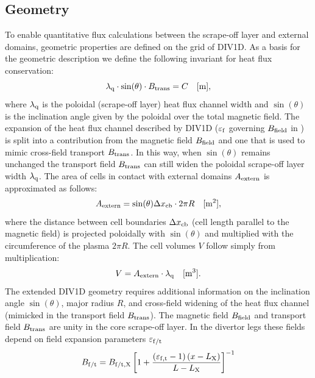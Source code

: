 \documentclass[amsmath,amssymb,a4]{revtex4-2}
\begin{document}
\subsection{Geometry}
To enable quantitative flux calculations between the scrape-off layer and external domains, geometric properties are defined on the grid of DIV1D. As a basis for the geometric description we define the following invariant for heat flux conservation:
\begin{equation}
    \lambda_{\rm q} \cdot \sin(\theta) \cdot B_{\rm trans} =  C \quad \mathrm{[m]}, 
\end{equation}
where $\lambda_{\rm q}$ is the poloidal (scrape-off layer) heat flux channel width and $\sin(\theta)$ is the inclination angle given by the poloidal over the total magnetic field. The expansion of the heat flux channel described by DIV1D  ($\varepsilon_{\rm f}$ governing $B_{\rm field}$ in \cite{derks2022}) is split into a contribution from the magnetic field $B_{\rm field}$ and one that is used to mimic cross-field transport $B_{\rm trans}$. In this way, when $\sin(\theta)$ remains unchanged the transport field $B_{\rm trans}$ can still widen the poloidal scrape-off layer width $\lambda_{\rm q}$.  
The area of cells in contact with external domains $A_{\rm extern}$ is approximated as follows:
\begin{equation}
    A_{\rm extern} =  \sin(\theta) \Delta x_{\rm cb}  \cdot 2 \pi R \quad \mathrm{[m^2]},
\end{equation}
where the distance between cell boundaries $\Delta x_{\rm cb}$  (cell length parallel to the magnetic field) is projected poloidally with $\sin(\theta)$ and multiplied with the circumference of the plasma $2\pi R$.
The cell volumes $V$ follow simply from multiplication:
\begin{equation}
    V = A_{\rm extern} \cdot \lambda_{\rm q} \quad \mathrm{[m^3]}.
\end{equation}
The extended DIV1D geometry requires additional information on the inclination angle $\sin(\theta)$, major radius $R$, and cross-field widening of the heat flux channel (mimicked in the transport field $B_{\rm trans}$). The magnetic field $B_{\rm field}$ and transport field $B_{\rm trans}$ are unity in the core scrape-off layer. In the divertor legs these fields depend on field expansion parameters $\varepsilon_{\rm f/t}$
\begin{equation}
B_{\rm  f/t}= B_{\mathrm{f/t,X}}\left[1+\frac{\left(\varepsilon_{\mathrm{f,t}}-1\right) (x-L_{\rm X})}{L-L_{\rm X}}\right]^{-1}
\end{equation}
\end{document}
